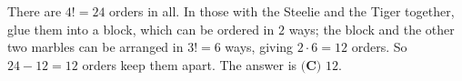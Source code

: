 There are $4!=24$ orders in all. In those with the Steelie and the Tiger together, glue them into a block, which can be ordered in $2$ ways; the block and the other two marbles can be arranged in $3!=6$ ways, giving $2\cdot6=12$ orders. So $24-12=12$ orders keep them apart. The answer is $\boxed{\textbf{(C) }12}$.
